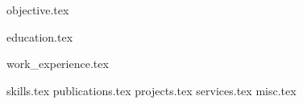 \documentclass{my_cv}
\newcommand*{\sectiondir}{resume/}
\begin{document}

{objective.tex}

\vspace{-7pt}
{education.tex}

\vspace{-15pt}
{work_experience.tex}

\vspace{-12pt}
{skills.tex}
{publications.tex}
{projects.tex}
{services.tex}
{misc.tex}


\end{document}
